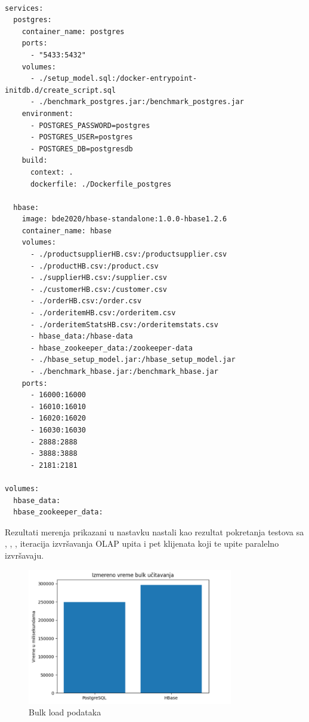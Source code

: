 \documentclass[12pt,oneside]{memoir}
\begin{document}
\begin{lstlisting}[title={docker-compose.yml - Definicija kontejnera za OLAP okruženje},captionpos=b]

services: 
  postgres:
    container_name: postgres
    ports:
      - "5433:5432"
    volumes:
      - ./setup_model.sql:/docker-entrypoint-initdb.d/create_script.sql
      - ./benchmark_postgres.jar:/benchmark_postgres.jar
    environment:
      - POSTGRES_PASSWORD=postgres
      - POSTGRES_USER=postgres
      - POSTGRES_DB=postgresdb
    build:
      context: .
      dockerfile: ./Dockerfile_postgres

  hbase:
    image: bde2020/hbase-standalone:1.0.0-hbase1.2.6
    container_name: hbase
    volumes:
      - ./productsupplierHB.csv:/productsupplier.csv
      - ./productHB.csv:/product.csv
      - ./supplierHB.csv:/supplier.csv
      - ./customerHB.csv:/customer.csv
      - ./orderHB.csv:/order.csv
      - ./orderitemHB.csv:/orderitem.csv
      - ./orderitemStatsHB.csv:/orderitemstats.csv
      - hbase_data:/hbase-data
      - hbase_zookeeper_data:/zookeeper-data
      - ./hbase_setup_model.jar:/hbase_setup_model.jar
      - ./benchmark_hbase.jar:/benchmark_hbase.jar
    ports:
      - 16000:16000
      - 16010:16010
      - 16020:16020
      - 16030:16030
      - 2888:2888
      - 3888:3888
      - 2181:2181

volumes:
  hbase_data:
  hbase_zookeeper_data:
\end{lstlisting}

Rezultati merenja prikazani u nastavku nastali kao rezultat pokretanja testova sa , , ,  iteracija izvršavanja OLAP upita i pet klijenata koji te upite paralelno izvršavaju.

\begin{figure}[!ht]
  \centering
  \includegraphics[width=0.8\textwidth]{bulk-load-vizualization.png}
  \caption{Bulk load podataka}
  \label{fig:grafikon}
\end{figure}
\end{document}
